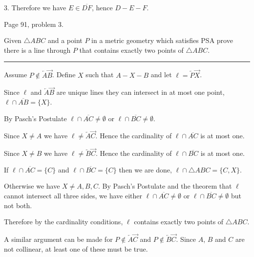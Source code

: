 \medskip
\item{3.} Therefore we have $E\in\overline{DF}$, hence $D{-}E{-}F$.






\vfill
\eject

\beginsection Page 91, problem 3.

Given $\triangle ABC$ and a point $P$ in a metric geometry which satisfies PSA
prove there is a line through $P$ that contains exactly two points of
$\triangle ABC$.

\medskip\hrule

\bigskip\noindent
Assume $P\not\in\overleftarrow A\overrightarrow B$.
Define $X$ such that $A{-}X{-}B$
and let $\ell=\overleftarrow P\overrightarrow X$.

\medskip\noindent
Since $\ell$ and $\overleftarrow A\overrightarrow B$ are unique lines
they can intersect in at most one point,
$\ell\cap\overline{AB}=\{X\}$.

\medskip\noindent
By Pasch's Postulate $\ell\cap\overline{AC}\ne\emptyset$ or $\ell\cap\overline{BC}\ne\emptyset$.

\medskip\noindent
Since $X\ne A$ we have $\ell\ne\overleftarrow A\overrightarrow C$.
Hence the cardinality of $\ell\cap\overline{AC}$ is at most one.

\medskip\noindent
Since $X\ne B$ we have $\ell\ne\overleftarrow B\overrightarrow C$.
Hence the cardinality of $\ell\cap\overline{BC}$ is at most one.

\medskip\noindent
If $\ell\cap\overline{AC}=\{C\}$ and $\ell\cap\overline{BC}=\{C\}$ then we are done,
$\ell\cap\triangle ABC=\{C,X\}$.

\medskip\noindent
Otherwise we have $X\ne A,B,C$.
By Pasch's Postulate and the theorem that $\ell$ cannot intersect all three sides,
we have either $\ell\cap\overline{AC}\ne\emptyset$ or $\ell\cap\overline{BC}\ne\emptyset$
but not both.

\medskip\noindent
Therefore by the cardinality conditions, $\ell$ contains exactly two points of $\triangle ABC$.

\medskip\noindent
A similar argument can be made for
$P\not\in\overleftarrow A\overrightarrow C$
and
$P\not\in\overleftarrow B\overrightarrow C$.
Since $A$, $B$ and $C$ are not collinear, at least one of these must be true.












